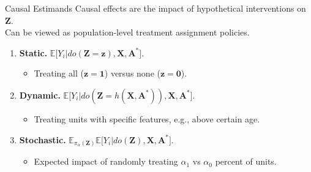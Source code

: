 \documentclass{beamer}
\def \bz {\textbf{z}}
\def \bZ {\textbf{Z}}
\def \bA {\textbf{A}}
\def \bX {\textbf{X}}
\def \bbE {\mathbb{E}}
\begin{document}
    \begin{frame}{Causal Estimands}
        \large
        Causal effects are the impact of hypothetical interventions on $\bZ$. \\
        \vspace{0.1cm}
        Can be viewed as population-level treatment assignment policies.
        \vspace{0.3cm}
        \pause
        \begin{enumerate}
            \item \textbf{Static.} $\bbE\big[Y_i \vert do(\bZ=\bz),\bX,\bA^\ast\big]$.
            \begin{itemize}
                \item Treating all ($\bz=\boldsymbol{1}$) versus none ($\bz = \boldsymbol{0}$).
            \end{itemize}
            \vspace{0.2cm}
            \item \textbf{Dynamic.} $\bbE\big[Y_i \vert do(\bZ=h(\bX,\bA^\ast)),\bX,\bA^\ast\big]$.
            \begin{itemize}
                \item Treating units with specific features, e.g., above certain age. 
            \end{itemize}
            \vspace{0.2cm}
            \item \textbf{Stochastic.} $\bbE_{\pi_\alpha(\bZ)}\bbE\big[Y_i \vert do(\bZ),\bX,\bA^\ast\big]$.
            \begin{itemize}
                \item Expected impact of randomly treating $\alpha_1$ vs $\alpha_0$ percent of units.
            \end{itemize}
        \end{enumerate}
    \end{frame}
\end{document}
